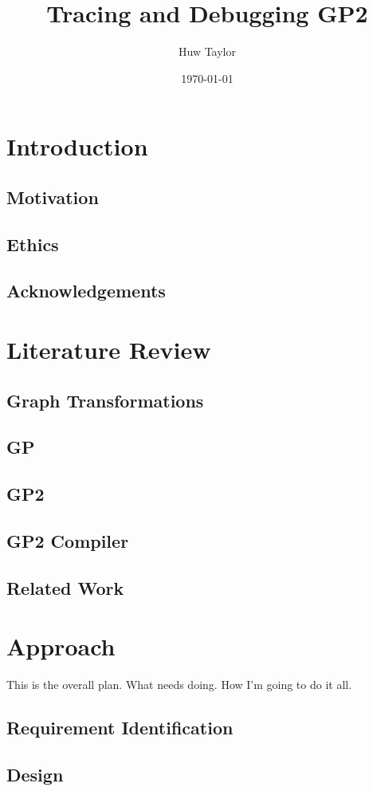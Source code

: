 \documentclass{article}
\author{Huw Taylor}
\title{Tracing and Debugging GP2}
\date{\today}
\begin{document}
\maketitle
\listoffigures
\listoftables

\chapter{Introduction}
\section{Motivation}
\section{Ethics}
\section{Acknowledgements}

\chapter{Literature Review}
\section{Graph Transformations}
\section{GP}
\section{GP2}
\section{GP2 Compiler}
\section{Related Work}

\chapter{Approach}
This is the overall plan. What needs doing. How I'm going to do it all.
\section{Requirement Identification}
\section{Design}
\end{document}
